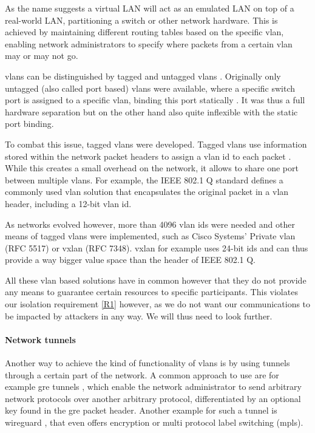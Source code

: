 As the name suggests a virtual LAN will act as an emulated LAN on top of a real-world LAN, partitioning a switch or other network hardware. This is achieved by maintaining different routing tables based on the specific \acrshort{vlan}, enabling network administrators to specify where packets from a certain \acrshort{vlan} may or may not go.

\acrshort{vlan}s can be distinguished by tagged and untagged \acrshort{vlan}s \cite[25.2]{IEEE8021Q}. Originally only untagged (also called port based) \acrshort{vlan}s were available, where a specific switch port is assigned to a specific \acrshort{vlan}, binding this port statically \cite[25.3]{IEEE8021Q}. It was thus a full hardware separation but on the other hand also quite inflexible with the static port binding.

To combat this issue, tagged \acrshort{vlan}s were developed. Tagged \acrshort{vlan}s use information stored within the network packet headers to assign a \acrshort{vlan} id to each packet \cite{IEEE8021Q}. While this creates a small overhead on the network, it allows to share one port between multiple \acrshort{vlan}s. For example, the IEEE 802.1 Q standard defines a commonly used \acrshort{vlan} solution that encapsulates the original packet in a \acrshort{vlan} header, including a 12-bit \acrshort{vlan} id.

As networks evolved however, more than 4096 \acrshort{vlan} ids were needed and other means of tagged \acrshort{vlan}s were implemented, such as Cisco Systems' Private \acrshort{vlan} (RFC 5517) \cite{rfc5517} or \acrshort{vxlan} (RFC 7348). \acrshort{vxlan} for example uses 24-bit ids and can thus provide a way bigger value space than the header of IEEE 802.1 Q.

All these \acrshort{vlan} based solutions have in common however that they do not provide any means to guarantee certain resources to specific participants. This violates our isolation requirement \ref{R1} however, as we do not want our communications to be impacted by attackers in any way. We will thus need to look further.

\paragraph{Network tunnels} Another way to achieve the kind of functionality of \acrshort{vlan}s is by using tunnels through a certain part of the network. A common approach to use are for example \acrshort{gre} tunnels \cite{rfc2784}, which enable the network administrator to send arbitrary network protocols over another arbitrary protocol, differentiated by an optional key found in the \acrshort{gre} packet header. Another example for such a tunnel is wireguard \cite{wireguard}, that even offers encryption or multi protocol label switching (\acrshort{mpls}).

